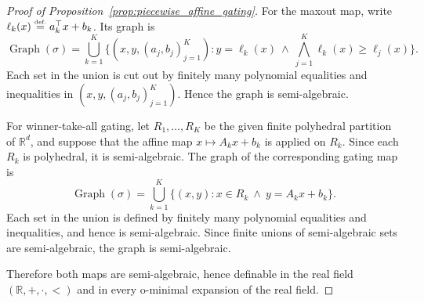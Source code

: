 \documentclass{article}
\newcommand{\eqdef}{\ensuremath{\stackrel{\mbox{\upshape\tiny def.}}{=}}}
\theoremstyle{plain}
\theoremstyle{definition}
\theoremstyle{remark}
\theoremstyle{plain}
\numberwithin{thm}{section}
\theoremstyle{definition}
\numberwithin{equation}{section}
\begin{document}



\begin{proof}[Proof of Proposition~\ref{prop:piecewise_affine_gating}]
For the maxout map, write $\ell_k(x)\eqdef a_k^{\top} x+b_k$.  Its graph is
$$
\operatorname{Graph}(\sigma)
=
\bigcup_{k=1}^K
\Big\{
(x,y,(a_j,b_j)_{j=1}^K):
y=\ell_k(x)
\ \wedge\
\bigwedge_{j=1}^K \ell_k(x)\ge \ell_j(x)
\Big\}.
$$
Each set in the union is cut out by finitely many polynomial equalities and inequalities in $(x,y,(a_j,b_j)_{j=1}^K)$.  Hence the graph is semi-algebraic.

For winner-take-all gating, let $R_1,\dots,R_K$ be the given finite
polyhedral partition of $\mathbb{R}^d$, and suppose that the affine map
$x\mapsto A_kx+b_k$ is applied on $R_k$.  Since each $R_k$ is polyhedral, it is
semi-algebraic.  The graph of the corresponding gating map is
$$
\operatorname{Graph}(\sigma)
=
\bigcup_{k=1}^K
\Big\{
(x,y):
x\in R_k
\ \wedge\
y=A_kx+b_k
\Big\}.
$$
Each set in the union is defined by finitely many polynomial equalities and
inequalities, and hence is semi-algebraic.  Since finite unions of
semi-algebraic sets are semi-algebraic, the graph is semi-algebraic.

Therefore both maps are semi-algebraic, hence definable in the real field
$(\mathbb{R},+,\cdot,<)$ and in every o-minimal expansion of the real field.
\end{proof}
\end{document}
